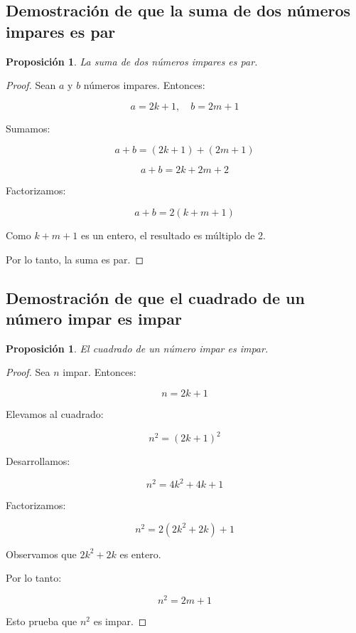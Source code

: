 \documentclass[12pt,final]{report}
\theoremstyle{plain}
\newtheorem{proposition}[theorem]{Proposición}
\theoremstyle{definition}
\begin{document}
\newpage

\subsection{Demostración de que la suma de dos números impares es par}

\begin{proposition}
La suma de dos números impares es par.
\end{proposition}

\begin{proof}

Sean $a$ y $b$ números impares. Entonces:

\[
a = 2k + 1, \quad b = 2m + 1
\]

Sumamos:

\[
a + b = (2k + 1) + (2m + 1)
\]

\[
a + b = 2k + 2m + 2
\]

Factorizamos:

\[
a + b = 2(k + m + 1)
\]

Como $k+m+1$ es un entero, el resultado es múltiplo de 2.

Por lo tanto, la suma es par.

\end{proof}

\newpage

\subsection{Demostración de que el cuadrado de un número impar es impar}

\begin{proposition}
El cuadrado de un número impar es impar.
\end{proposition}

\begin{proof}

Sea $n$ impar. Entonces:

\[
n = 2k + 1
\]

Elevamos al cuadrado:

\[
n^2 = (2k + 1)^2
\]

Desarrollamos:

\[
n^2 = 4k^2 + 4k + 1
\]

Factorizamos:

\[
n^2 = 2(2k^2 + 2k) + 1
\]

Observamos que $2k^2 + 2k$ es entero.

Por lo tanto:

\[
n^2 = 2m + 1
\]

Esto prueba que $n^2$ es impar.

\end{proof}
\end{document}

